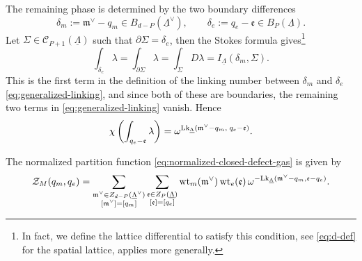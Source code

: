 The remaining phase is determined by the two boundary differences
\begin{equation}
\delta_m:=\mathfrak m^\vee-q_m\in B_{d-P}(\underline\Lambda^\vee),
\qquad
\delta_e:=q_e-\mathfrak e\in B_P(\underline\Lambda).
\end{equation}
Let \(\Sigma\in \mathcal C_{P+1}(\underline\Lambda)\)
such that \(\partial\Sigma=\delta_e\), then the Stokes formula gives\footnote{In fact, we define the lattice differential to satisfy this condition, see \eqref{eq:d-def} for the spatial lattice, applies more generally.}
\begin{equation}
\int_{\delta_e}\lambda
=
\int_{\partial\Sigma}\lambda
=
\int_\Sigma D\lambda
=
I_{\underline\Lambda}(\delta_m,\Sigma).
\end{equation}
This is the first term in the definition of the linking number between $\delta_m$ and $\delta_e$ \eqref{eq:generalized-linking}, and since both of these are boundaries, the remaining two terms in \eqref{eq:generalized-linking} vanish. Hence
\begin{equation}
	\chi \left(\int_{q_e-\mathfrak e}\lambda\right)
	=
	\omega^{
		\mathrm{Lk}_{\underline\Lambda}
		(\mathfrak m^\vee-q_m,\;q_e-\mathfrak e)
	}.
	\label{eq:Xi-linking-phase}
\end{equation}

\begin{prop}
	\label{prop:closed-defect-gas-fixed-charge}
	The normalized partition function \eqref{eq:normalized-closed-defect-gas} is given by
	\begin{equation}
		\mathcal Z_M(q_m,q_e)
		=
		\sum_{\substack{\mathfrak m^\vee\in Z_{d-P}(\underline\Lambda^\vee)\\
				[\mathfrak m^\vee]=[q_m]}}
		\sum_{\substack{\mathfrak e\in Z_P(\underline\Lambda)\\
				[\mathfrak e]=[q_e]}}
		\mathrm{wt}_m(\mathfrak m^\vee)\,
		\mathrm{wt}_e(\mathfrak e)\,
		\omega^{-
			\mathrm{Lk}_{\underline\Lambda}
			(\mathfrak m^\vee-q_m,\mathfrak e-q_e)
		}.
		\label{eq:closed-defect-gas-fixed-charge}
	\end{equation}
\end{prop}

